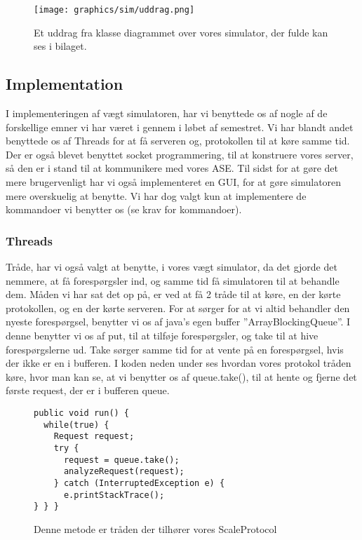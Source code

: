 \documentclass[a4paper]{article}
\newenvironment{changemargin}[2]{%
\begin{list}{}{%
\setlength{\topsep}{0pt}%
\setlength{\leftmargin}{#1}%
\setlength{\rightmargin}{#2}%
\setlength{\listparindent}{\parindent}%
\setlength{\itemindent}{\parindent}%
\setlength{\parsep}{\parskip}%
}%
\item[]}{\end{list}}
\begin{document}
\begin{figure}[H]
\begin{changemargin}{-0.5cm}{}
  \centering
  \texttt{[image: graphics/sim/uddrag.png]}
\end{changemargin}
  \caption{Et uddrag fra klasse diagrammet over vores simulator, der fulde kan ses i bilaget.}
\end{figure}



\subsection{Implementation} %

I implementeringen af vægt simulatoren, har vi benyttede os af nogle af de forskellige emner vi har været i gennem i løbet af semestret. Vi har blandt andet benyttede os af Threads for at få serveren og, protokollen til at køre samme tid. Der er også blevet benyttet socket programmering, til at konstruere vores server, så den er i stand til at kommunikere med vores ASE. Til sidst for at gøre det mere brugervenligt har vi også implementeret en GUI, for at gøre simulatoren mere overskuelig at benytte. Vi har dog valgt kun at implementere de kommandoer vi benytter os (se krav for kommandoer).

\subsubsection{Threads} %

Tråde, har vi også valgt at benytte, i vores vægt simulator, da det gjorde det nemmere, at få forespørgsler ind, og samme tid få simulatoren til at behandle dem. Måden vi har sat det op på, er ved at få 2 tråde til at køre, en der kørte protokollen, og en der kørte serveren. For at sørger for at vi altid behandler den nyeste forespørgsel, benytter vi os af java’s egen buffer ”ArrayBlockingQueue”. I denne benytter vi os af put, til at tilføje forespørgsler, og take til at hive forespørgslerne ud. Take sørger samme tid for at vente på en forespørgsel, hvis der ikke er en i bufferen. I koden neden under ses hvordan vores protokol tråden køre, hvor man kan se, at vi benytter os af queue.take(), til at hente og fjerne det første request, der er i bufferen queue.

\begin{figure}[h!]
\begin{lstlisting}
public void run() {
  while(true) {
    Request request;
    try {
      request = queue.take();
      analyzeRequest(request);
    } catch (InterruptedException e) {
      e.printStackTrace();
} } }
\end{lstlisting}
  \caption{Denne metode er tråden der tilhører vores ScaleProtocol}
\end{figure}
\end{document}
